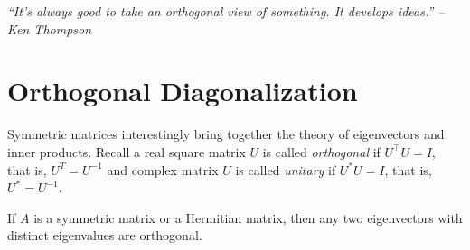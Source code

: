 \begin{center} 
\emph{``It's always good to take an orthogonal view of something. It develops ideas.'' -- Ken Thompson}
\end{center}

\section{Orthogonal Diagonalization}\label{sec:orthodiagonable}
Symmetric matrices interestingly bring together the theory of eigenvectors and inner products. Recall a real square matrix $U$ is called \emph{orthogonal} if $U^\top U = I$, that is, $U^{T} = U^{-1}$ and complex matrix $U$ is called \emph{unitary} if $U^*U=I$, that is, $U^*=U^{-1}$.\\

\begin{Thm} If $A$ is a symmetric matrix or a Hermitian matrix, then any two eigenvectors with distinct eigenvalues are orthogonal.
\end{Thm}
\vs

